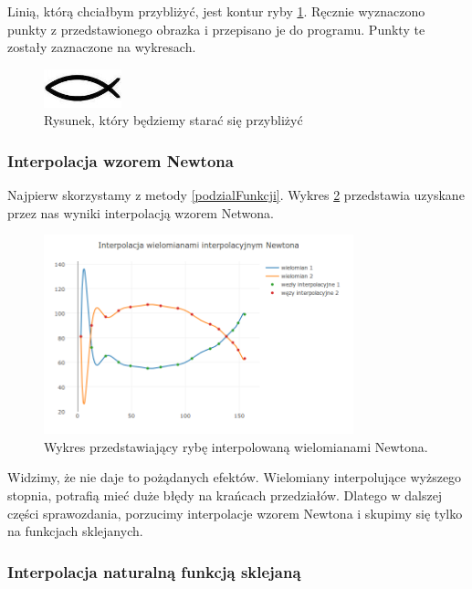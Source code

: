 \documentclass{article}
\begin{document}
	Linią, którą chciałbym przybliżyć, jest kontur ryby \ref{Ryba}.
	Ręcznie wyznaczono punkty z przedstawionego obrazka i przepisano je do programu. Punkty te zostały zaznaczone na wykresach.
	
		\begin{figure}[h]
			\centering
			\includegraphics[width=0.2\textwidth]{rybka.jpg}
			\caption{Rysunek, który będziemy starać się przybliżyć}
			\label{Ryba}
		\end{figure}
		
	\subsubsection{Interpolacja wzorem Newtona}
	
	Najpierw skorzystamy z metody \ref{podzialFunkcji}. Wykres \ref{Wykres:Ryba_Newton} przedstawia uzyskane przez nas wyniki interpolacją wzorem Netwona.	
	
		\begin{figure}[h]
			\centering
			\includegraphics[width=0.8\textwidth]{newplot.png}
			\caption{Wykres przedstawiający rybę interpolowaną wielomianami Newtona.}
			\label{Wykres:Ryba_Newton}
		\end{figure}
		
	\newpage
	
	Widzimy, że nie daje to pożądanych efektów. Wielomiany interpolujące wyższego stopnia, potrafią mieć duże błędy na krańcach przedziałów. Dlatego w dalszej części sprawozdania, porzucimy interpolacje wzorem Newtona i skupimy się tylko na funkcjach sklejanych.
	
	\subsubsection{Interpolacja naturalną funkcją sklejaną}
	
\end{document}
